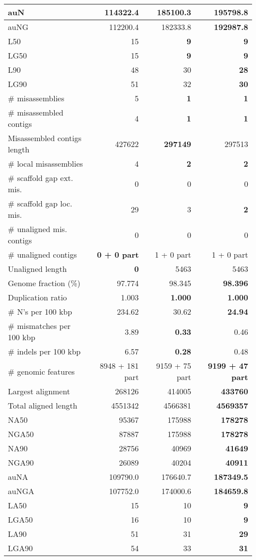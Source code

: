 \documentclass[12pt,a4paper]{article}
\begin{document}
\begin{table}[ht]
\begin{center}
\begin{tabular}{|l*{3}{|r}|}
auN & 114322.4 & 185100.3 & {\bf 195798.8} \\ \hline
auNG & 112200.4 & 182333.8 & {\bf 192987.8} \\ \hline
L50 & 15 & {\bf 9} & {\bf 9} \\ \hline
LG50 & 15 & {\bf 9} & {\bf 9} \\ \hline
L90 & 48 & 30 & {\bf 28} \\ \hline
LG90 & 51 & 32 & {\bf 30} \\ \hline
\# misassemblies & 5 & {\bf 1} & {\bf 1} \\ \hline
\# misassembled contigs & 4 & {\bf 1} & {\bf 1} \\ \hline
Misassembled contigs length & 427622 & {\bf 297149} & 297513 \\ \hline
\# local misassemblies & 4 & {\bf 2} & {\bf 2} \\ \hline
\# scaffold gap ext. mis. & 0 & 0 & 0 \\ \hline
\# scaffold gap loc. mis. & 29 & 3 & {\bf 2} \\ \hline
\# unaligned mis. contigs & 0 & 0 & 0 \\ \hline
\# unaligned contigs & {\bf 0 + 0 part} & 1 + 0 part & 1 + 0 part \\ \hline
Unaligned length & {\bf 0} & 5463 & 5463 \\ \hline
Genome fraction (\%) & 97.774 & 98.345 & {\bf 98.396} \\ \hline
Duplication ratio & 1.003 & {\bf 1.000} & {\bf 1.000} \\ \hline
\# N's per 100 kbp & 234.62 & 30.62 & {\bf 24.94} \\ \hline
\# mismatches per 100 kbp & 3.89 & {\bf 0.33} & 0.46 \\ \hline
\# indels per 100 kbp & 6.57 & {\bf 0.28} & 0.48 \\ \hline
\# genomic features & 8948 + 181 part & 9159 + 75 part & {\bf 9199 + 47 part} \\ \hline
Largest alignment & 268126 & 414005 & {\bf 433760} \\ \hline
Total aligned length & 4551342 & 4566381 & {\bf 4569357} \\ \hline
NA50 & 95367 & 175988 & {\bf 178278} \\ \hline
NGA50 & 87887 & 175988 & {\bf 178278} \\ \hline
NA90 & 28756 & 40969 & {\bf 41649} \\ \hline
NGA90 & 26089 & 40204 & {\bf 40911} \\ \hline
auNA & 109790.0 & 176640.7 & {\bf 187349.5} \\ \hline
auNGA & 107752.0 & 174000.6 & {\bf 184659.8} \\ \hline
LA50 & 15 & 10 & {\bf 9} \\ \hline
LGA50 & 16 & 10 & {\bf 9} \\ \hline
LA90 & 51 & 31 & {\bf 29} \\ \hline
LGA90 & 54 & 33 & {\bf 31} \\ \hline
\end{tabular}
\end{center}
\end{table}
\end{document}
